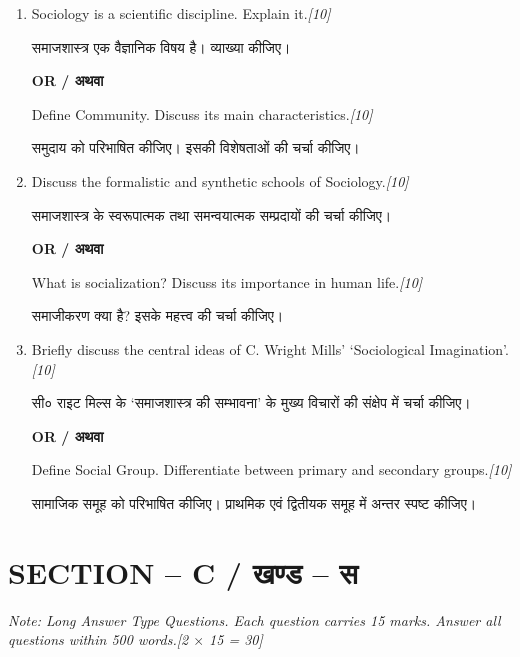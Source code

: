 \documentclass[11pt,a4paper]{article}
\newcommand{\pts}[1]{\hfill \textit{[#1]}}
\begin{document}
\begin{enumerate}[label=\textbf{\arabic*.},leftmargin=*,start=2,itemsep=12pt]

  \item Sociology is a scientific discipline. Explain it.\pts{10}
  
  समाजशास्त्र एक वैज्ञानिक विषय है। व्याख्या कीजिए।

  \begin{center}\textbf{OR / अथवा}\end{center}

  Define Community. Discuss its main characteristics.\pts{10}
  
  समुदाय को परिभाषित कीजिए। इसकी विशेषताओं की चर्चा कीजिए।

  \item Discuss the formalistic and synthetic schools of Sociology.\pts{10}
  
  समाजशास्त्र के स्वरूपात्मक तथा समन्वयात्मक सम्प्रदायों की चर्चा कीजिए।

  \begin{center}\textbf{OR / अथवा}\end{center}

  What is socialization? Discuss its importance in human life.\pts{10}
  
  समाजीकरण क्या है? इसके महत्त्व की चर्चा कीजिए।

  \item Briefly discuss the central ideas of C. Wright Mills' `Sociological Imagination'.\pts{10}
  
  सी० राइट मिल्स के `समाजशास्त्र की सम्भावना' के मुख्य विचारों की संक्षेप में चर्चा कीजिए।

  \begin{center}\textbf{OR / अथवा}\end{center}

  Define Social Group. Differentiate between primary and secondary groups.\pts{10}
  
  सामाजिक समूह को परिभाषित कीजिए। प्राथमिक एवं द्वितीयक समूह में अन्तर स्पष्ट कीजिए।

\end{enumerate}

\bigskip

\section*{SECTION -- C / खण्ड -- स}
\noindent \textit{Note: Long Answer Type Questions. Each question carries 15 marks. Answer all questions within 500 words.}\pts{2 $\times$ 15 = 30}
\end{document}

